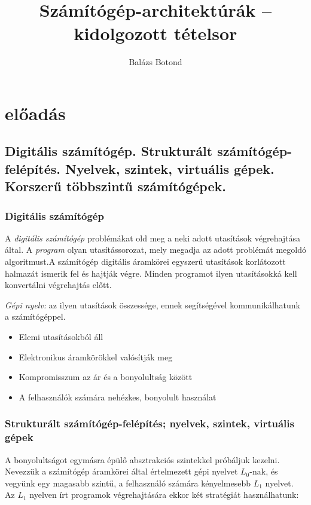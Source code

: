 \documentclass{article}
\title{Számítógép-architektúrák -- kidolgozott tételsor}
\author{Balázs Botond}
\begin{document}
\maketitle

\section{előadás}

\subsection{Digitális számítógép. Strukturált számítógép-felépítés. Nyelvek, szintek, virtuális gépek. Korszerű többszintű számítógépek.}

\subsubsection{Digitális számítógép}

A \emph{digitális számítógép} problémákat old meg a neki adott utasítások végrehajtása által. A \textit{program} olyan utasítássorozat, mely megadja az adott problémát megoldó algoritmust.A számítógép digitális áramkörei egyszerű utasítások korlátozott halmazát ismerik fel és hajtják végre. Minden programot ilyen utasításokká kell konvertálni végrehajtás előtt.

\textit{Gépi nyelv:} az ilyen utasítások összessége, ennek segítségével kommunikálhatunk a számítógéppel.

\begin{itemize}
	\item Elemi utasításokból áll
	\item Elektronikus áramkörökkel valósítják meg
	\item Kompromisszum az ár és a bonyolultság között
	\item A felhasználók számára nehézkes, bonyolult használat
\end{itemize}

\subsubsection{Strukturált számítógép-felépítés; nyelvek, szintek, virtuális gépek}

A bonyolultságot egymásra épülő absztrakciós szintekkel próbáljuk kezelni. Nevezzük a számítógép áramkörei által értelmezett gépi nyelvet $L_0$-nak, és vegyünk egy magasabb szintű, a felhasználó számára kényelmesebb $L_1$ nyelvet. Az $L_1$ nyelven írt programok végrehajtására ekkor két stratégiát használhatunk:
\end{document}
